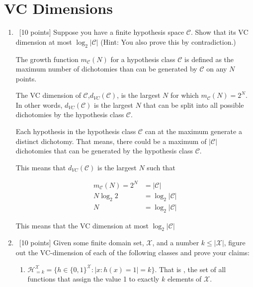 \section{VC Dimensions}
\label{sec:vc-dimension}
\begin{enumerate}
\item ~[10 points] Suppose you have a finite hypothesis space
  $\mathcal{C}$. Show that its VC dimension at most
  $\log_2|\mathcal{C}|$ (Hint: You also prove this by contradiction.)

The growth function $m_\mathcal{C}(N)$ for a hypothesis class $\mathcal{C}$ is defined as the maximum number of dichotomies than can be generated by $\mathcal{C}$ on any $N$ points. 

The VC dimension of $\mathcal{C}$,$d_{VC}(\mathcal{C})$, is the largest $N$ for which $m_\mathcal{C}(N)=2^N$. In other words, $d_{VC}(\mathcal{C})$ is the largest $N$ that can be split into all possible dichotomies by the hypothesis class $\mathcal{C}$.

Each hypothesis in the hypothesis class $\mathcal{C}$ can at the maximum generate a distinct dichotomy. That means, there could be a maximum of $\left | \mathcal{C} \right| $ dichotomies that can be generated by the hypothesis class $\mathcal{C}$.

This means that $d_{VC}(\mathcal{C})$ is the largest $N$ such that 

\begin{equation*}
\begin{aligned}
m_\mathcal{C}(N)=2^N &= \left | \mathcal{C} \right| \\
N \log_2 2 &= \log_2 \left | \mathcal{C} \right| \\
N &= \log_2|\mathcal{C}|
\end{aligned}
\end{equation*}

This means that the VC dimension at most $\log_2|\mathcal{C}|$

\item ~[10 points] Given some finite domain set, $\mathcal{X}$, and a
  number $k \leq |\mathcal{X}|$, figure out the VC-dimension of each
  of the following classes and prove your claims:

  \begin{enumerate}
  \item
    $\mathcal{H}_{=k}^{\mathcal{X}} = \{h \in \{0,1\}^\mathcal{X} :
    |{x : h(x) = 1} | = k \}$. That is , the set of all functions that
    assign the value 1 to exactly $k$ elements of $\mathcal{X}$.


\end{enumerate}
\end{enumerate}

